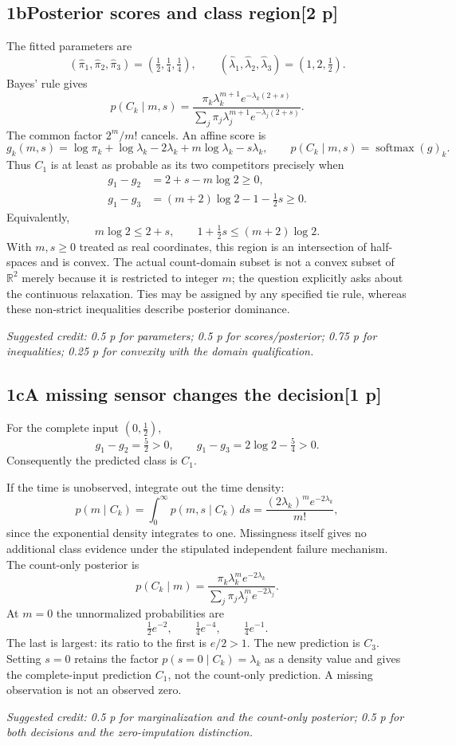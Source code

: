 \documentclass[11pt,a4paper]{article}
\newcommand{\R}{\mathbb R}
\newcommand{\solution}[3]{\Needspace{6\baselineskip}\subsection*{\color{examblue}#1\quad #2\hfill\normalsize[#3 p]}}
\newcommand{\selfcredit}[1]{\par\textit{Suggested credit: #1}\par}
\begin{document}
\solution{1b}{Posterior scores and class region}{2}
The fitted parameters are
\[
\boxed{(\widehat\pi_1,\widehat\pi_2,\widehat\pi_3)
=(\tfrac12,\tfrac14,\tfrac14),\qquad
(\widehat\lambda_1,\widehat\lambda_2,\widehat\lambda_3)=(1,2,\tfrac12)}.
\]
Bayes' rule gives
\[
p(C_k\mid m,s)=
\frac{\pi_k\lambda_k^{m+1}e^{-\lambda_k(2+s)}}
{\sum_j\pi_j\lambda_j^{m+1}e^{-\lambda_j(2+s)}}.
\]
The common factor $2^m/m!$ cancels. An affine score is
\[
g_k(m,s)=\log\pi_k+\log\lambda_k-2\lambda_k
+m\log\lambda_k-s\lambda_k,
\qquad p(C_k\mid m,s)=\operatorname{softmax}(g)_k.
\]
Thus $C_1$ is at least as probable as its two competitors precisely when
\begin{align*}
g_1-g_2&=2+s-m\log2\geq0,\\
g_1-g_3&=(m+2)\log2-1-\tfrac12s\geq0.
\end{align*}
Equivalently,
\[
\boxed{m\log2\leq2+s,\qquad 1+\tfrac12s\leq(m+2)\log2}.
\]
With $m,s\geq0$ treated as real coordinates, this region is an intersection
of half-spaces and is convex. The actual count-domain subset is not a convex
subset of $\R^2$ merely because it is restricted to integer $m$; the question
explicitly asks about the continuous relaxation. Ties may be assigned by any
specified tie rule, whereas these non-strict inequalities describe posterior dominance.
\selfcredit{0.5 p for parameters; 0.5 p for scores/posterior; 0.75 p for inequalities; 0.25 p for convexity with the domain qualification.}

\solution{1c}{A missing sensor changes the decision}{1}
For the complete input $(0,\tfrac12)$,
\[
g_1-g_2=\tfrac52>0,\qquad
g_1-g_3=2\log2-\tfrac54>0.
\]
Consequently the predicted class is $\boxed{C_1}$.

If the time is unobserved, integrate out the time density:
\[
p(m\mid C_k)=\int_0^\infty p(m,s\mid C_k)\,ds
=\frac{(2\lambda_k)^me^{-2\lambda_k}}{m!},
\]
since the exponential density integrates to one. Missingness itself gives no
additional class evidence under the stipulated independent failure mechanism.
The count-only posterior is
\[
\boxed{p(C_k\mid m)=
\frac{\pi_k\lambda_k^m e^{-2\lambda_k}}
{\sum_j\pi_j\lambda_j^m e^{-2\lambda_j}}}.
\]
At $m=0$ the unnormalized probabilities are
\[
\tfrac12e^{-2},\qquad\tfrac14e^{-4},\qquad\tfrac14e^{-1}.
\]
The last is largest: its ratio to the first is $e/2>1$. The new prediction is
$\boxed{C_3}$. Setting $s=0$ retains the factor $p(s=0\mid C_k)=\lambda_k$
as a density value and gives the complete-input prediction $C_1$, not the
count-only prediction. A missing observation is not an observed zero.
\selfcredit{0.5 p for marginalization and the count-only posterior; 0.5 p for both decisions and the zero-imputation distinction.}
\end{document}
